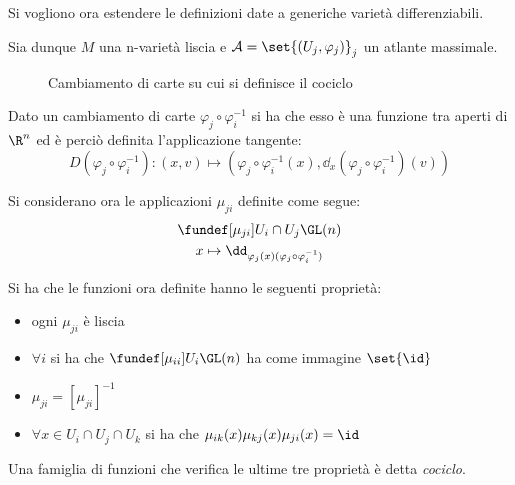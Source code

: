 
Si vogliono ora estendere le definizioni date a generiche varietà differenziabili.

Sia dunque $M$ una n-varietà liscia e $\mathcal{A} = \set{(U_j, \varphi _j)}_j$ un atlante massimale.

\begin{figure}
\centering

\caption{Cambiamento di carte su cui si definisce il cociclo}
\end{figure}

\begin{oss}
Dato un cambiamento di carte $\varphi _j \circ \varphi _i ^{-1}$ si ha che esso è una funzione tra aperti di $\R ^n$ ed è perciò definita l'applicazione tangente:
\begin{equation*}
D(\varphi _j \circ \varphi _i ^{-1}): (x,v) \mapsto (\varphi _j \circ \varphi _i ^{-1}(x), \dd_x(\varphi _j \circ \varphi _i ^{-1})(v))
\end{equation*}
\end{oss}

Si considerano ora le applicazioni $\mu_{ji}$ definite come segue:
\begin{gather*}
\fundef[\mu_{ji}]{U_i\cap U_j}{\GL(n)} \\
x \mapsto \dd_{\varphi_j(x)(\varphi _j \circ \varphi _i ^{-1})}
\end{gather*}

\begin{oss}
Si ha che le funzioni ora definite hanno le seguenti proprietà:
\begin{itemize}
\item ogni $\mu_{ji}$ è liscia
\item $\forall i$ si ha che $\fundef[\mu_{ii}]{U_i}{\GL(n)}$ ha come immagine $\set{\id}$
\item $\mu_{ji} = [\mu_{ji}]^{-1}$
\item $\forall x \in U_i\cap U_j\cap U_k$ si ha che $\mu_{ik}(x)\mu_{kj}(x)\mu_{ji}(x) = \id$
\end{itemize}
Una famiglia di funzioni che verifica le ultime tre proprietà è detta \emph{cociclo}.
\end{oss}


\begin{epigraphs}	
\end{epigraphs}
